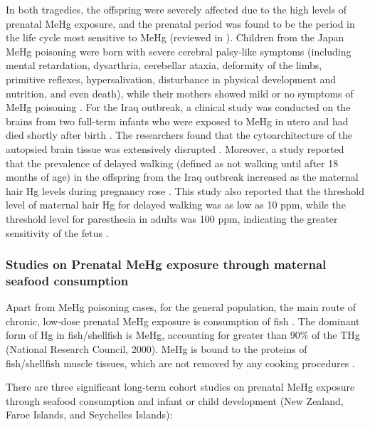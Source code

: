 In both tragedies, the offspring were severely affected due to the high levels of prenatal MeHg exposure, and the prenatal period was found to be the period in the life cycle most sensitive to MeHg (reviewed in \cite{clarkson2006toxicology}). Children from the Japan MeHg poisoning were born with severe cerebral palsy-like symptoms (including mental retardation, dysarthria, cerebellar ataxia, deformity of the limbs, primitive reflexes, hypersalivation, disturbance in physical development and nutrition, and even death), while their mothers showed mild or no symptoms of MeHg poisoning \citep{harada1995minamata}. For the Iraq outbreak, a clinical study was conducted on the brains from two full-term infants who were exposed to MeHg in utero and had died shortly after birth \citep{choi1978abnormal}. The researchers found that the cytoarchitecture of the autopsied brain tissue was extensively disrupted \citep{choi1978abnormal}. Moreover, a study reported that the prevalence of delayed walking (defined as not walking until after 18 months of age) in the offspring from the Iraq outbreak increased as the maternal hair Hg levels during pregnancy rose \citep{cox1989dose}. This study also reported that the threshold level of maternal hair Hg for delayed walking was as low as 10 ppm, while the threshold level for paresthesia in adults was 100 ppm, indicating the greater sensitivity of the fetus \citep{cox1989dose}. 

\subsubsection{Studies on Prenatal MeHg exposure through maternal seafood consumption}

Apart from MeHg poisoning cases, for the general population, the main route of chronic, low-dose prenatal MeHg exposure is consumption of fish \citep{national2000toxicological,smith2005fish}. The dominant form of Hg in fish/shellfish is MeHg, accounting for greater than 90\% of the THg (National Research Council, 2000). MeHg is bound to the proteins of fish/shellfish muscle tissues, which are not removed by any cooking procedures \citep{mergler2007methylmercury}. 

There are three significant long-term cohort studies on prenatal MeHg exposure through seafood consumption and infant or child development (New Zealand, Faroe Islands, and Seychelles Islands): 

